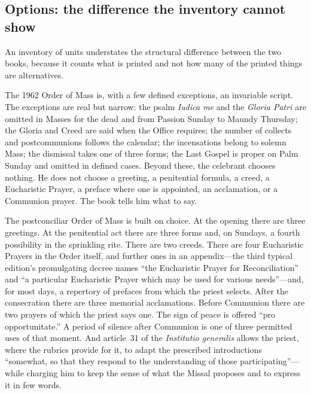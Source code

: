 \subsection{Options: the difference the inventory cannot show}

An inventory of units understates the structural difference between the two books, because it counts what is printed and not how many of the printed things are alternatives.

The 1962 Order of Mass is, with a few defined exceptions, an invariable script. The exceptions are real but narrow: the psalm \emph{Iudica me} and the \emph{Gloria Patri} are omitted in Masses for the dead and from Passion Sunday to Maundy Thursday; the Gloria and Creed are said when the Office requires; the number of collects and postcommunions follows the calendar; the incensations belong to solemn Mass; the dismissal takes one of three forms; the Last Gospel is proper on Palm Sunday and omitted in defined cases. Beyond these, the celebrant chooses nothing. He does not choose a greeting, a penitential formula, a creed, a Eucharistic Prayer, a preface where one is appointed, an acclamation, or a Communion prayer. The book tells him what to say.

The postconciliar Order of Mass is built on choice. At the opening there are three greetings. At the penitential act there are three forms and, on Sundays, a fourth possibility in the sprinkling rite. There are two creeds. There are four Eucharistic Prayers in the Order itself, and further ones in an appendix---the third typical edition's promulgating decree names ``the Eucharistic Prayer for Reconciliation'' and ``a particular Eucharistic Prayer which may be used for various needs''---and, for most days, a repertory of prefaces from which the priest selects. After the consecration there are three memorial acclamations. Before Communion there are two prayers of which the priest says one. The sign of peace is offered ``pro opportunitate.'' A period of silence after Communion is one of three permitted uses of that moment. And article~31 of the \emph{Institutio generalis} allows the priest, where the rubrics provide for it, to adapt the prescribed introductions ``somewhat, so that they respond to the understanding of those participating''---while charging him to keep the sense of what the Missal proposes and to express it in few words.

